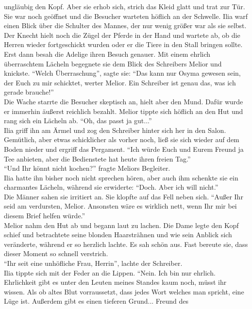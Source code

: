 ungläubig den Kopf. Aber sie erhob sich, strich das Kleid glatt und trat zur Tür. Sie war noch 
geöffnet und die Besucher warteten höflich an der Schwelle. Ilia warf einen Blick über die Schulter 
des Mannes, der nur wenig größer war als sie selbst. Der Knecht hielt noch die Zügel der Pferde in 
der Hand und wartete ab, ob die Herren wieder fortgeschickt wurden oder er die Tiere in den Stall 
bringen sollte. Erst dann besah die Adelige ihren Besuch genauer. Mit einem ehrlich überraschtem 
Lächeln begegnete sie dem Blick des Schreibers Melior und knickste. ``Welch Überraschung'', sagte 
sie: ``Das kann nur Osyma gewesen sein, der Euch zu mir schicktet, werter Melior. Ein Schreiber ist 
genau das, was ich gerade brauche!''\\
Die Wache starrte die Besucher skeptisch an, hielt aber den Mund. Dafür wurde er immerhin äußerst 
reichlich bezahlt. Melior tippte sich höflich an den Hut und rang sich ein Lächeln ab. ``Oh, das 
passt ja gut...''\\
Ilia griff ihn am Ärmel und zog den Schreiber hinter sich her in den Salon. Gemütlich, aber etwas 
schicklicher als vorher noch, ließ sie sich wieder auf dem Boden nieder und ergriff das Pergament. 
``Ich würde Euch und Eurem Freund ja Tee anbieten, aber die Bedienstete hat heute ihren freien 
Tag.''\\
``Und Ihr könnt nicht kochen?'' fragte Meliors Begleiter.\\
Ilia hatte ihn bisher noch nicht sprechen hören, aber auch ihm schenkte sie ein charmantes Lächeln, 
während sie erwiderte: ``Doch. Aber ich will nicht.''\\
Die Männer sahen sie irritiert an. Sie klopfte auf das Fell neben sich. ``Außer Ihr seid am 
verdursten, Melior. Ansonsten wäre es wirklich nett, wenn Ihr mir bei diesem Brief helfen würde.''\\
Melior nahm den Hut ab und begann laut zu lachen. Die Dame legte den Kopf schief und betrachtete 
seine blonden Haarsträhnen und wie sein Anblick sich veränderte, während er so herzlich lachte. Es 
sah schön aus. Fast bereute sie, dass dieser Moment so schnell verstrich.\\
``Ihr seit eine unhöfliche Frau, Herrin'', lachte der Schreiber.\\
Ilia tippte sich mit der Feder an die Lippen. ``Nein. Ich bin nur ehrlich. Ehrlichkeit gibt es 
unter den Leuten meines Standes kaum noch, müsst ihr wissen. Als ob altes Blut vorraussetzt, dass 
jedes Wort welches man spricht, eine Lüge ist. Außerdem gibt es einen tieferen Grund... Freund des 
